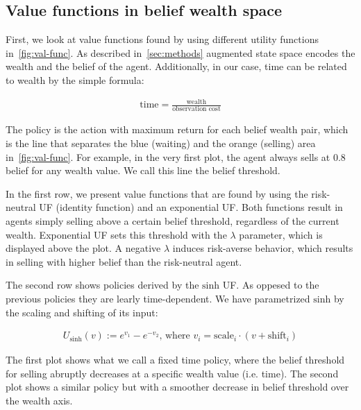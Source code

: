 % 


\subsection{Value functions in belief wealth space}\label{ssec:val-func}

First, we look at value functions found by using different utility functions in~\autoref{fig:val-func}.
As described in~\autoref{sec:methods} augmented state space encodes the wealth and the belief of the agent. 
Additionally, in our case, time can be related to wealth by the simple formula:

\begin{align*}
\text{time} = \frac{\text{wealth}}{\text{observation\ cost}}
\end{align*}

The policy is the action with maximum return for each belief wealth pair, which is the line that separates the blue (waiting) and the orange (selling) area in~\autoref{fig:val-func}. For example, in the very first plot, the agent always sells at 0.8 belief for any wealth value. We call this line the belief threshold.

In the first row, we present value functions that are found by using the risk-neutral UF (identity function) and an exponential UF. Both functions result in agents simply selling above a certain belief threshold, regardless of the current wealth.
Exponential UF sets this threshold with the $\lambda$ parameter, which is displayed above the plot.
A negative $\lambda$ induces risk-averse behavior, which results in selling with higher belief than the risk-neutral agent.

The second row shows policies derived by the $\text{sinh}$ UF. As oppesed to the previous policies they are learly time-dependent. We have parametrized $\text{sinh}$ by the scaling and shifting of its input:

\begin{align*}
    U_\text{sinh}(v) := e^{v_1} - e^{-v_2} \text{, where\ } v_i = \text{scale}_i\cdot(v+\text{shift}_i)
\end{align*}

The first plot shows what we call a fixed time policy, where the belief threshold for selling abruptly decreases at a specific wealth value (i.e. time).
The second plot shows a similar policy but with a smoother decrease in belief threshold over the wealth axis.

